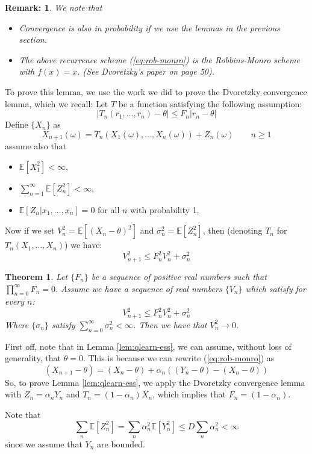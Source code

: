 \documentclass{article}
\def\E{\mathbb{E}}
\newtheorem{theorem}{Theorem}
\newtheorem*{remark}{Remark:}
\begin{document}
\begin{remark}
We note that
\begin{itemize}
    \item Convergence is also in probability if we use the lemmas in the previous section.
    \item The above recurrence scheme (\ref{eq:rob-monro}) is the Robbins-Monro scheme with $f(x) = x$. (See Dvoretzky's paper on page 50).
\end{itemize} 
\end{remark}

To prove this lemma, we use the work we did to prove the Dvoretzky convergence lemma, which we recall:
Let $T$ be a function satisfying the following assumption:
\[ 
|T_n(r_1,\dots,r_n) - \theta| \le F_n | r_n - \theta |
\]
Define $\{X_n\}$ as
\[
X_{n+1}(\omega) = T_n(X_1(\omega),\dots,X_n(\omega)) + Z_n(\omega) \qquad n \ge 1 
\]
assume also that
\begin{itemize}
    \item $\mathbb{E}[X_1^2] < \infty$,
    \item $\sum_{n=1}^{\infty}\E[Z_n^2] < \infty$,
    \item $\E[Z_n | x_1,\dots,x_n] = 0$ for all $n$ with probability 1,
\end{itemize}

Now if we set $V_n^2 = \E\left[ (X_n - \theta)^2\right]$ and $\sigma_n^2 = \E\left[ Z_n^2 \right]$, then (denoting $T_n$ for $T_n(X_1,\dots,X_n)$) we have:
\[ V_{n+1}^2 \le F_n^2 V_n^2 + \sigma_n^2\]

\begin{theorem}
Let $\{F_n\}$ be a sequence of positive real numbers such that $\prod_{n=0}^\infty F_n =0$. Assume we have a sequence of real numbers $\{V_n\}$ which satisfy for every $n$:
\[ 
    V_{n+1}^2 \le F_n^2 V_n^2 + \sigma_n^2
\]
Where $\{\sigma_n\}$ satisfy $\sum_{n=0}^\infty \sigma_n^2 < \infty$. Then we have that $V_n^2 \rightarrow 0$.
\end{theorem}

First off, note that in Lemma \ref{lem:qlearn-ess}, we can assume, without loss of generality, that $\theta = 0$. 
This is because we can rewrite (\ref{eq:rob-monro}) as 
\[ 
    (X_{n+1} - \theta)= (X_n - \theta) + \alpha_n ((Y_n-\theta) - (X_n-\theta))    
\] 
So, to prove Lemma \ref{lem:qlearn-ess}, we apply the Dvoretzky convergence lemma with $Z_n = \alpha_n Y_n$ and $T_n = (1 - \alpha_n)X_n$, which implies that $F_n = (1 - \alpha_n)$. 

Note that $$\sum_n\E[Z_n^2] = \sum_n \alpha_n^2 \E[Y_n^2] \le D \sum_n \alpha_n^2 < \infty$$ since we assume that $Y_n$ are bounded. 
\end{document}
